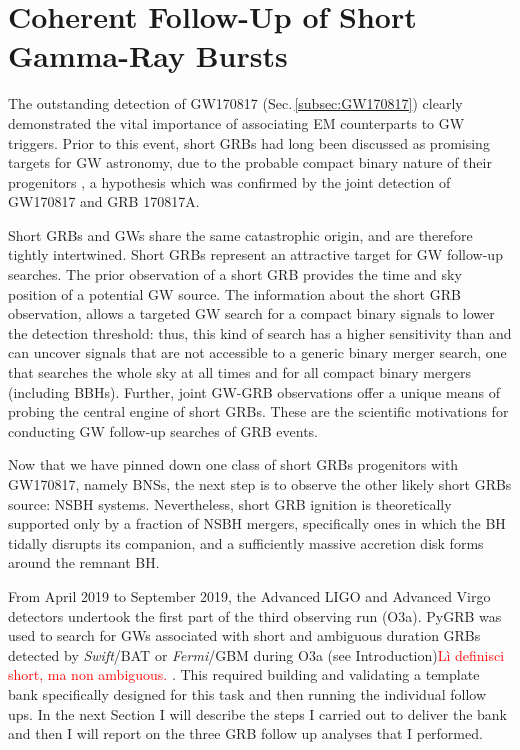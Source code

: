 \documentclass[binding=0.6cm, LaM]{sapthesis}
\newcommand{\fpg}[1]{\textcolor{red}{#1} }
\begin{document}
\section{Coherent Follow-Up of Short Gamma-Ray Bursts}
\label{sec:grbfollowup}
	The outstanding detection of GW170817 (Sec.\,\ref{subsec:GW170817}) 
        clearly demonstrated the vital importance of associating EM counterparts to GW triggers.
        Prior to this event, short GRBs had long been discussed as promising targets for GW astronomy,
        due to the probable compact binary nature of their progenitors \cite{154},
        a hypothesis which was confirmed by the joint detection of GW170817 and GRB 170817A.	

	Short GRBs and GWs 
	share the same catastrophic origin, 
	and are therefore tightly intertwined.
	Short GRBs represent an attractive target for GW follow-up searches. 
	The prior observation of a short GRB provides the time and sky position of a potential GW source. 
	The information about the short GRB observation, allows a targeted GW search for a compact binary signals to lower the detection threshold: thus,
        this kind of search has a higher sensitivity than
        and can uncover signals that are not accessible to
        a generic binary merger search, one that searches the whole sky at all times and for all compact binary mergers (including BBHs).
        Further, joint GW-GRB observations offer a unique means of probing the central engine of short GRBs.
        These are the scientific motivations for conducting GW follow-up searches of GRB events.

	Now that we have pinned down one class of short GRBs progenitors with GW170817, namely BNSs, 
	the next step is to observe the other likely short GRBs source: NSBH systems.
	Nevertheless, short GRB ignition is theoretically supported only by a fraction of NSBH mergers,
	specifically ones in which the BH tidally disrupts its companion, 
	and a sufficiently massive accretion disk forms around the remnant BH.

	From April 2019 to September 2019, the Advanced LIGO  and  Advanced  Virgo detectors undertook 
	the first part of the third observing run (O3a).
	{\rm PyGRB} was used to search for GWs associated with short and ambiguous duration GRBs detected by {\it Swift}/BAT or {\it Fermi}/GBM during O3a (see Introduction)\fpg{L\`i definisci short, ma non ambiguous.}.
	This required building and validating a template bank specifically designed for this task and then running the individual follow ups.  In the next Section I will describe the steps I carried out to deliver the bank and then I will report on the three GRB follow up analyses that I performed.
\end{document}
